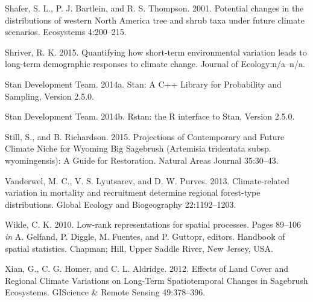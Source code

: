 \documentclass[12pt,]{article}
\begin{document}
\hypertarget{ref-Shafer2001}{}
Shafer, S. L., P. J. Bartlein, and R. S. Thompson. 2001. Potential
changes in the distributions of western North America tree and shrub
taxa under future climate scenarios. Ecosystems 4:200--215.

\hypertarget{ref-Shriver2015}{}
Shriver, R. K. 2015. Quantifying how short-term environmental variation
leads to long-term demographic responses to climate change. Journal of
Ecology:n/a--n/a.

\hypertarget{ref-stan2014}{}
Stan Development Team. 2014a. Stan: A C++ Library for Probability and
Sampling, Version 2.5.0.

\hypertarget{ref-rstan2014}{}
Stan Development Team. 2014b. Rstan: the R interface to Stan, Version
2.5.0.

\hypertarget{ref-Still2015}{}
Still, S., and B. Richardson. 2015. Projections of Contemporary and
Future Climate Niche for Wyoming Big Sagebrush (Artemisia tridentata
subsp. wyomingensis): A Guide for Restoration. Natural Areas Journal
35:30--43.

\hypertarget{ref-Vanderwel2013b}{}
Vanderwel, M. C., V. S. Lyutsarev, and D. W. Purves. 2013.
Climate-related variation in mortality and recruitment determine
regional forest-type distributions. Global Ecology and Biogeography
22:1192--1203.

\hypertarget{ref-Wikle2010}{}
Wikle, C. K. 2010. Low-rank representations for spatial processes. Pages
89--106 \emph{in} A. Gelfand, P. Diggle, M. Fuentes, and P. Guttopr,
editors. Handbook of spatial statistics. Chapman; Hill, Upper Saddle
River, New Jersey, USA.

\hypertarget{ref-Xian2012}{}
Xian, G., C. G. Homer, and C. L. Aldridge. 2012. Effects of Land Cover
and Regional Climate Variations on Long-Term Spatiotemporal Changes in
Sagebrush Ecosystems. GIScience \& Remote Sensing 49:378--396.
\end{document}
